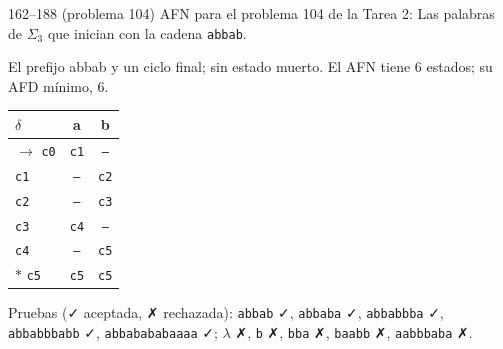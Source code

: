 \documentclass[11pt]{article}
\begin{document}
\begin{ejercicio}{162--188 (problema 104)}{}
AFN para el problema 104 de la Tarea 2: Las palabras de $\Sigma_3$ que inician con la cadena \texttt{abbab}.
\end{ejercicio}
\proc El prefijo abbab y un ciclo final; sin estado muerto. El AFN tiene 6 estados; su AFD mínimo, 6.
\begin{center}\small\begin{tabular}{lcc}\toprule
$\delta$ & a & b \\\midrule
$\to$ \texttt{c0} & \texttt{c1} & \texttt{--} \\
 \texttt{c1} & \texttt{--} & \texttt{c2} \\
 \texttt{c2} & \texttt{--} & \texttt{c3} \\
 \texttt{c3} & \texttt{c4} & \texttt{--} \\
 \texttt{c4} & \texttt{--} & \texttt{c5} \\
$*$ \texttt{c5} & \texttt{c5} & \texttt{c5} \\
\bottomrule\end{tabular}\end{center}
Pruebas (✓ aceptada, ✗ rechazada): \texttt{abbab} ✓, \texttt{abbaba} ✓, \texttt{abbabbba} ✓, \texttt{abbabbbabb} ✓, \texttt{abbabababaaaa} ✓; $\lambda$ ✗, \texttt{b} ✗, \texttt{bba} ✗, \texttt{baabb} ✗, \texttt{aabbbaba} ✗.
\end{document}

